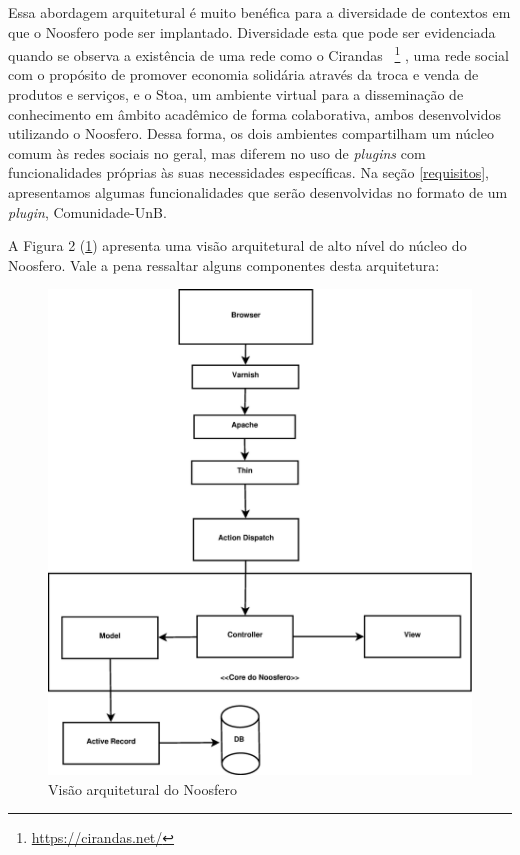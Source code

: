 Essa abordagem arquitetural é muito benéfica para a diversidade de contextos
em que o Noosfero pode ser implantado. Diversidade esta que pode ser evidenciada
quando se observa a existência de uma rede como o Cirandas
~\footnote{\url{https://cirandas.net/}}
, uma rede social com o propósito de promover economia solidária através
da troca e venda de produtos e serviços, e o
Stoa, um ambiente virtual para a disseminação de conhecimento em âmbito
acadêmico de forma colaborativa, ambos desenvolvidos utilizando o Noosfero.
Dessa forma, os dois ambientes compartilham um núcleo comum às redes sociais
no geral, mas diferem no uso de \textit{plugins} com funcionalidades próprias
às suas necessidades específicas. Na seção \ref{requisitos}, apresentamos
algumas funcionalidades que serão desenvolvidas no formato de um \textit{plugin},
Comunidade-UnB.



A Figura 2 (\ref{noosfero-arch}) apresenta uma visão arquitetural de alto nível
do núcleo do Noosfero. Vale a pena ressaltar alguns componentes desta arquitetura:

\begin{figure}[h]
	\centering
	\label{noosfero-arch}
		\includegraphics[keepaspectratio=true,scale=0.25]
		{figuras/noosfero_architeture.eps}
	\caption{Visão arquitetural do Noosfero}
\end{figure}

